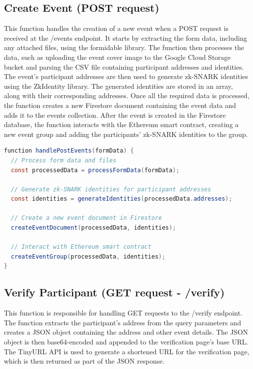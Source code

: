 \subsection{Create Event (POST request)}
This function handles the creation of a new event when a POST request is received at the /events endpoint. It starts by extracting the form data, including any attached files, using the formidable library. The function then processes the data, such as uploading the event cover image to the Google Cloud Storage bucket and parsing the CSV file containing participant addresses and identities.
The event's participant addresses are then used to generate zk-SNARK identities using the ZkIdentity library. The generated identities are stored in an array, along with their corresponding addresses. Once all the required data is processed, the function creates a new Firestore document containing the event data and adds it to the events collection.
After the event is created in the Firestore database, the function interacts with the Ethereum smart contract, creating a new event group and adding the participants' zk-SNARK identities to the group.

\begin{lstlisting}[language=Java, name={Create Event Function}, label={sc:createEvent}]
function handlePostEvents(formData) {
  // Process form data and files
  const processedData = processFormData(formData);

  // Generate zk-SNARK identities for participant addresses
  const identities = generateIdentities(processedData.addresses);

  // Create a new event document in Firestore
  createEventDocument(processedData, identities);

  // Interact with Ethereum smart contract
  createEventGroup(processedData, identities);
}
\end{lstlisting}

\subsection{Verify Participant (GET request - /verify)}
This function is responsible for handling GET requests to the /verify endpoint. The function extracts the participant's address from the query parameters and creates a JSON object containing the address and other event details. The JSON object is then base64-encoded and appended to the verification page's base URL. The TinyURL API is used to generate a shortened URL for the verification page, which is then returned as part of the JSON response.

